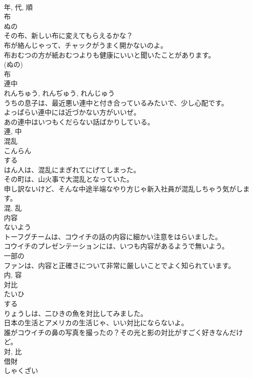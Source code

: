 \documentclass[8pt]{extreport}
\begin{document}
\begin{CJK}{UTF8}{min}
\\	年, 代, 順	
\\	布	
\\	ぬの	
\\	その布、新しい布に変えてもらえるかな？	
\\	布が絡んじゃって、チャックがうまく開かないのよ。	
\\	布おむつの方が紙おむつよりも健康にいいと聞いたことがあります。	
\\	(ぬの) 
\\	布	
\\	連中	
\\	れんちゅう, れんぢゅう, れんじゅう	
\\	うちの息子は、最近悪い連中と付き合っているみたいで、少し心配です。	
\\	よっぱらい連中には近づかない方がいいぜ。	
\\	あの連中はいつもくだらない話ばかりしている。	
\\	連, 中	
\\	混乱	
\\	こんらん	
\\	する 
\\	はん人は、混乱にまぎれてにげてしまった。	
\\	その町は、山火事で大混乱となっていた。	
\\	申し訳ないけど、そんな中途半端なやり方じゃ新入社員が混乱しちゃう気がします。	
\\	混, 乱	
\\	内容	
\\	ないよう	
\\	トーフグチームは、コウイチの話の内容に細かい注意をはらいました。	
\\	コウイチのプレゼンテーションには、いつも内容があるようで無いよう。	
\\	一部の
\\	ファンは、内容と正確さについて非常に厳しいことでよく知られています。	
\\	内, 容	
\\	対比	
\\	たいひ	
\\	する 
\\	りょうしは、二ひきの魚を対比してみました。	
\\	日本の生活とアメリカの生活じゃ、いい対比にならないよ。	
\\	誰がコウイチの鼻の写真を撮ったの？その光と影の対比がすごく好きなんだけど。	
\\	対, 比	
\\	借財	
\\	しゃくざい	

\end{CJK}
\end{document}

